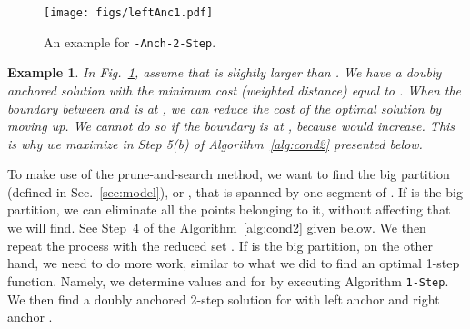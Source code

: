 \documentclass[preprint,10pt]{elsarticle}
\newcommand{\hide}[1]{}
\newcommand{\QED}{\hfill}
\newtheorem{example}{Example}
\newtheorem{procedure}{Procedure}
\begin{document}
\begin{figure}[ht]
\centering
\texttt{[image: figs/leftAnc1.pdf]}
\hspace{2mm}
\caption{An example for {\tt -Anch-2-Step}.
}
\label{fig:leftAnc}
\end{figure}
\begin{example}
In Fig.~\ref{fig:leftAnc},
assume that  is slightly larger than .
We have a doubly anchored solution with the minimum cost (weighted distance)
equal to .
When the boundary between  and  is at ,
we can reduce the cost of the optimal solution by moving  up.
We cannot do so if the boundary is at ,
because  would increase.
This is why we maximize  in Step 5(b) of Algorithm~\ref{alg:cond2}
presented below.
\QED
\end{example}



To make use of the prune-and-search method,
we want to find the big partition (defined in Sec.~\ref{sec:model}),
 or , that is spanned by one segment of .
\hide{\begin{procedure} {\tt Big2--Anc}\label{proc:big2}
\begin{enumerate}
\item
Divide  into left partition  and right partition ,
whose sizes differ by at most one.\footnote{As before,
we assume that the points have different -coordinates.
}
\item
Let  be the segment with  spanning ,
and let  be the 1-step (optimal) solution for .
\item
If  (resp. )
then  (resp. ) is the big partition.
\end{enumerate}
\end{procedure}
}If  is the big partition, we can eliminate all the points belonging to it,
without affecting  that we will find.
See Step~4 of the Algorithm~\ref{alg:cond2} given below.
We then repeat the process with the reduced set .
If  is the big partition, on the other hand, we need to do more work,
similar to what we did to find an optimal 1-step function.
Namely,
we determine values  and  for  by executing Algorithm {\tt 1-Step}.
We then find a doubly anchored 2-step solution for  with left anchor 
and right anchor .
\end{document}

